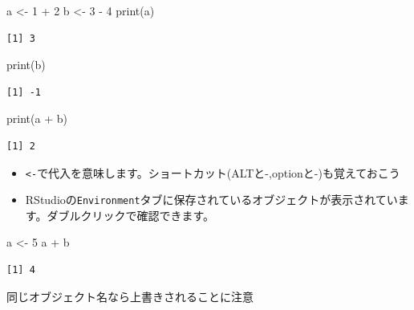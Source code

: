 \documentclass[
  a4paper,
]{ltjsbook}
\newenvironment{Shaded}{\begin{snugshade}}{\end{snugshade}}
\newcommand{\DecValTok}[1]{\textcolor[rgb]{0.68,0.00,0.00}{#1}}
\newcommand{\FunctionTok}[1]{\textcolor[rgb]{0.28,0.35,0.67}{#1}}
\newcommand{\NormalTok}[1]{\textcolor[rgb]{0.00,0.23,0.31}{#1}}
\newcommand{\OtherTok}[1]{\textcolor[rgb]{0.00,0.23,0.31}{#1}}
\newcommand{\SpecialCharTok}[1]{\textcolor[rgb]{0.37,0.37,0.37}{#1}}
\providecommand{\tightlist}{%
  \setlength{\itemsep}{0pt}\setlength{\parskip}{0pt}}\usepackage{longtable,booktabs,array}
\begin{document}
\begin{Shaded}
\begin{Highlighting}[]
\NormalTok{a }\OtherTok{\textless{}{-}} \DecValTok{1} \SpecialCharTok{+} \DecValTok{2}
\NormalTok{b }\OtherTok{\textless{}{-}} \DecValTok{3} \SpecialCharTok{{-}} \DecValTok{4}
\FunctionTok{print}\NormalTok{(a)}
\end{Highlighting}
\end{Shaded}

\begin{verbatim}
[1] 3
\end{verbatim}

\begin{Shaded}
\begin{Highlighting}[]
\FunctionTok{print}\NormalTok{(b)}
\end{Highlighting}
\end{Shaded}

\begin{verbatim}
[1] -1
\end{verbatim}

\begin{Shaded}
\begin{Highlighting}[]
\FunctionTok{print}\NormalTok{(a }\SpecialCharTok{+}\NormalTok{ b)}
\end{Highlighting}
\end{Shaded}

\begin{verbatim}
[1] 2
\end{verbatim}

\begin{itemize}
\tightlist
\item
  \texttt{\textless{}-}で代入を意味します。ショートカット(ALTと-,optionと-)も覚えておこう
\item
  RStudioの\texttt{Environment}タブに保存されているオブジェクトが表示されています。ダブルクリックで確認できます。
\end{itemize}

\begin{Shaded}
\begin{Highlighting}[]
\NormalTok{a }\OtherTok{\textless{}{-}} \DecValTok{5}
\NormalTok{a }\SpecialCharTok{+}\NormalTok{ b}
\end{Highlighting}
\end{Shaded}

\begin{verbatim}
[1] 4
\end{verbatim}

同じオブジェクト名なら上書きされることに注意
\end{document}
